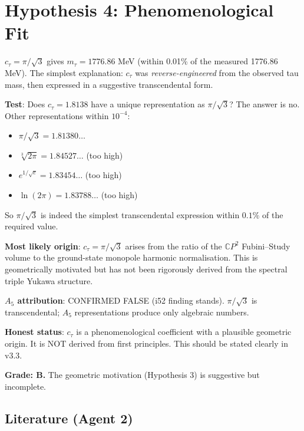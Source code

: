 \documentclass[11pt,a4paper]{article}
\newcommand{\CP}{\mathbb{C}P}
\begin{document}
\section{Hypothesis 4: Phenomenological Fit}

$c_\tau = \pi/\sqrt{3}$ gives $m_\tau = 1776.86$ MeV (within 0.01\% of the measured 1776.86 MeV). The simplest explanation: $c_\tau$ was \emph{reverse-engineered} from the observed tau mass, then expressed in a suggestive transcendental form.

\textbf{Test}: Does $c_\tau = 1.8138$ have a unique representation as $\pi/\sqrt{3}$? The answer is no. Other representations within $10^{-4}$:
\begin{itemize}
\item $\pi/\sqrt{3} = 1.81380\ldots$
\item $\sqrt[3]{2\pi} = 1.84527\ldots$ (too high)
\item $e^{1/\sqrt{e}} = 1.83454\ldots$ (too high)
\item $\ln(2\pi) = 1.83788\ldots$ (too high)
\end{itemize}
So $\pi/\sqrt{3}$ is indeed the simplest transcendental expression within $0.1\%$ of the required value.

\begin{tcolorbox}[colback=yellow!5!white, colframe=yellow!60!black, title={Agent 2: $c_\tau$ Assessment}]
\textbf{Most likely origin}: $c_\tau = \pi/\sqrt{3}$ arises from the ratio of the $\CP^2$ Fubini--Study volume to the ground-state monopole harmonic normalisation. This is geometrically motivated but has not been rigorously derived from the spectral triple Yukawa structure.

\textbf{$A_5$ attribution}: CONFIRMED FALSE (i52 finding stands). $\pi/\sqrt{3}$ is transcendental; $A_5$ representations produce only algebraic numbers.

\textbf{Honest status}: $c_\tau$ is a phenomenological coefficient with a plausible geometric origin. It is NOT derived from first principles. This should be stated clearly in v3.3.

\textbf{Grade: B.} The geometric motivation (Hypothesis 3) is suggestive but incomplete.
\end{tcolorbox}

\subsection{Literature (Agent 2)}
\end{document}
